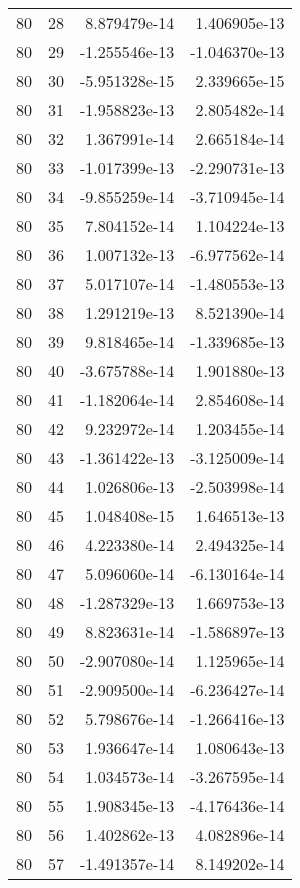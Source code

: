 \begin{tabular}{rrrr}
  80 &   28 &  8.879479e-14 &  1.406905e-13 \\
  80 &   29 & -1.255546e-13 & -1.046370e-13 \\
  80 &   30 & -5.951328e-15 &  2.339665e-15 \\
  80 &   31 & -1.958823e-13 &  2.805482e-14 \\
  80 &   32 &  1.367991e-14 &  2.665184e-14 \\
  80 &   33 & -1.017399e-13 & -2.290731e-13 \\
  80 &   34 & -9.855259e-14 & -3.710945e-14 \\
  80 &   35 &  7.804152e-14 &  1.104224e-13 \\
  80 &   36 &  1.007132e-13 & -6.977562e-14 \\
  80 &   37 &  5.017107e-14 & -1.480553e-13 \\
  80 &   38 &  1.291219e-13 &  8.521390e-14 \\
  80 &   39 &  9.818465e-14 & -1.339685e-13 \\
  80 &   40 & -3.675788e-14 &  1.901880e-13 \\
  80 &   41 & -1.182064e-14 &  2.854608e-14 \\
  80 &   42 &  9.232972e-14 &  1.203455e-14 \\
  80 &   43 & -1.361422e-13 & -3.125009e-14 \\
  80 &   44 &  1.026806e-13 & -2.503998e-14 \\
  80 &   45 &  1.048408e-15 &  1.646513e-13 \\
  80 &   46 &  4.223380e-14 &  2.494325e-14 \\
  80 &   47 &  5.096060e-14 & -6.130164e-14 \\
  80 &   48 & -1.287329e-13 &  1.669753e-13 \\
  80 &   49 &  8.823631e-14 & -1.586897e-13 \\
  80 &   50 & -2.907080e-14 &  1.125965e-14 \\
  80 &   51 & -2.909500e-14 & -6.236427e-14 \\
  80 &   52 &  5.798676e-14 & -1.266416e-13 \\
  80 &   53 &  1.936647e-14 &  1.080643e-13 \\
  80 &   54 &  1.034573e-14 & -3.267595e-14 \\
  80 &   55 &  1.908345e-13 & -4.176436e-14 \\
  80 &   56 &  1.402862e-13 &  4.082896e-14 \\
  80 &   57 & -1.491357e-14 &  8.149202e-14 \\

\end{tabular}
